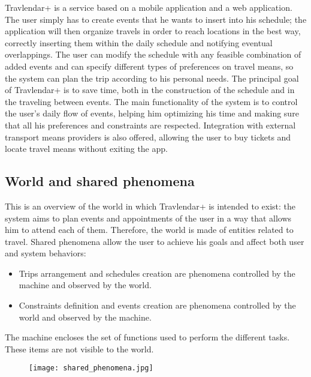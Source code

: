 Travlendar+ is a service based on a mobile application and a web application.
\newline
\newline
The user simply has to create events that he wants to insert into his schedule; the application will then organize travels in order to reach locations in the best way, correctly inserting them within the daily schedule and notifying eventual overlappings. \newline
The user can modify the schedule with any feasible combination of added events and can specify different types of preferences on travel means, so the system can plan the trip according to his personal needs.
\newline
\newline
The principal goal of Travlendar+ is to save time, both in the construction of the schedule and in the traveling between events.
The main functionality of the system is to control the user's daily flow of events, helping him optimizing his time and making sure that all his preferences and constraints are respected.
Integration with external transport means providers is also offered, allowing the user to buy tickets and locate travel means without exiting the app.
\newline

\subsection{World and shared phenomena}
This is an overview of the world in which Travlendar+ is intended to exist: the system aims to plan events and appointments of the user in a way that allows him to attend each of them. Therefore, the world is made of entities related to travel. 
\newline
\newline
Shared phenomena allow the user to achieve his goals and affect both user and system behaviors:
\begin{itemize}
	\item Trips arrangement and schedules creation are phenomena controlled by the machine and observed by the world. 
	\item Constraints definition and events creation are phenomena controlled by the world and observed by the machine.
\end{itemize}
The machine encloses the set of functions used to perform the different tasks. These items are not visible to the world.
\newline
\begin{figure} [h]
\centering
\texttt{[image: shared\_phenomena.jpg]}
\end{figure}
